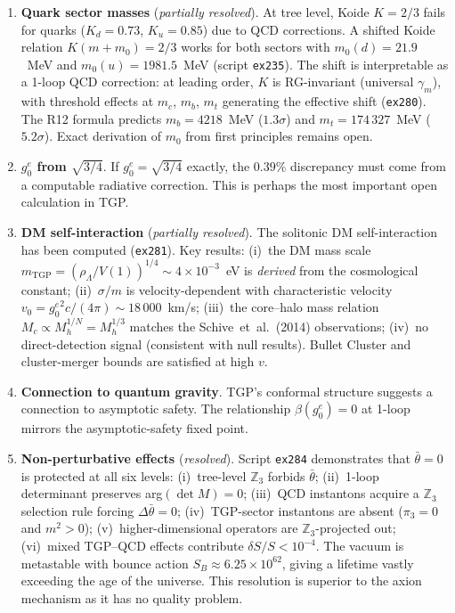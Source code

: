 \documentclass[aps,prd,twocolumn,superscriptaddress,showpacs,
  nofootinbib,floatfix,longbibliography]{revtex4-2}
\newcommand{\gone}{{g_0^e}}
\newcommand{\ZZ}{\mathbb{Z}}
\begin{document}
\begin{enumerate}
\item \textbf{Quark sector masses} (\emph{partially resolved}).
  At tree level, Koide $K = 2/3$ fails for quarks ($K_d = 0.73$,
  $K_u = 0.85$) due to QCD corrections.
  A shifted Koide relation $K(m + m_0) = 2/3$ works for both
  sectors with $m_0(d) = 21.9$~MeV and $m_0(u) = 1981.5$~MeV
  (script \texttt{ex235}).
  The shift is interpretable as a 1-loop QCD correction:
  at leading order, $K$ is RG-invariant (universal $\gamma_m$),
  with threshold effects at $m_c$, $m_b$, $m_t$ generating
  the effective shift (\texttt{ex280}).
  The R12 formula predicts $m_b = 4218$~MeV ($1.3\sigma$)
  and $m_t = 174\,327$~MeV ($5.2\sigma$).
  Exact derivation of $m_0$ from first principles remains open.

\item \textbf{$g_0^e$ from $\sqrt{3/4}$}.
  If $\gone = \sqrt{3/4}$ exactly, the $0.39\%$ discrepancy must come
  from a computable radiative correction. This is perhaps the most
  important open calculation in TGP.

\item \textbf{DM self-interaction} (\emph{partially resolved}).
  The solitonic DM self-interaction has been computed
  (\texttt{ex281}).  Key results: (i)~the DM mass scale
  $m_\mathrm{TGP} = (\rho_\Lambda / V(1))^{1/4} \sim 4 \times
  10^{-3}$~eV is \emph{derived} from the cosmological constant;
  (ii)~$\sigma/m$ is velocity-dependent with characteristic velocity
  $v_0 = \gone^2 c / (4\pi) \sim 18\,000$~km/s;
  (iii)~the core--halo mass relation $M_c \propto M_h^{1/N}
  = M_h^{1/3}$ matches the Schive~et~al.\ (2014) observations;
  (iv)~no direct-detection signal (consistent with null results).
  Bullet Cluster and cluster-merger bounds are satisfied at high $v$.

\item \textbf{Connection to quantum gravity}.
  TGP's conformal structure suggests a connection to asymptotic safety.
  The relationship $\beta(\gone) = 0$ at 1-loop mirrors the
  asymptotic-safety fixed point.

\item \textbf{Non-perturbative effects} (\emph{resolved}).
  Script \texttt{ex284} demonstrates that $\bar\theta = 0$ is protected
  at all six levels: (i)~tree-level $\ZZ_3$ forbids $\bar\theta$;
  (ii)~1-loop determinant preserves arg$(\det M) = 0$;
  (iii)~QCD instantons acquire a $\ZZ_3$ selection rule forcing
  $\Delta\bar\theta = 0$; (iv)~TGP-sector instantons are absent
  ($\pi_3 = 0$ and $m^2 > 0$); (v)~higher-dimensional operators are
  $\ZZ_3$-projected out; (vi)~mixed TGP--QCD effects contribute
  $\delta S/S < 10^{-4}$. The vacuum is metastable with bounce action
  $S_B \approx 6.25 \times 10^{62}$, giving a lifetime vastly exceeding
  the age of the universe. This resolution is superior to the axion
  mechanism as it has no quality problem.


\end{enumerate}
\end{document}
